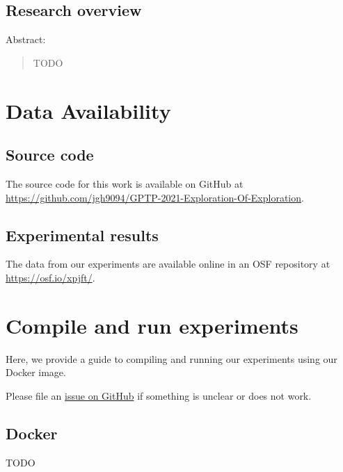 \documentclass[]{book}
\begin{document}
\hypertarget{research-overview}{%
\section{Research overview}\label{research-overview}}

Abstract:

\begin{quote}
TODO
\end{quote}

\hypertarget{data-availability}{%
\chapter{Data Availability}\label{data-availability}}

\hypertarget{source-code}{%
\section{Source code}\label{source-code}}

The source code for this work is available on GitHub at \url{https://github.com/jgh9094/GPTP-2021-Exploration-Of-Exploration}.

\hypertarget{experimental-results}{%
\section{Experimental results}\label{experimental-results}}

The data from our experiments are available online in an OSF repository \citep{osf_data} at \url{https://osf.io/xpjft/}.

\hypertarget{compile-and-run-experiments}{%
\chapter{Compile and run experiments}\label{compile-and-run-experiments}}

Here, we provide a guide to compiling and running our experiments using our Docker image.

Please file an \href{https://github.com/jgh9094/GPTP-2021-Exploration-Of-Exploration/issues}{issue on GitHub} if something is unclear or does not work.

\hypertarget{docker}{%
\section{Docker}\label{docker}}

TODO
\end{document}
